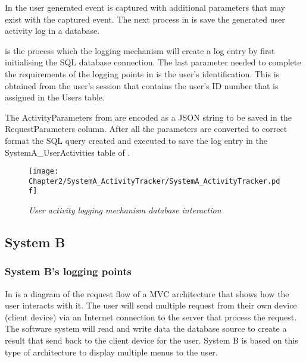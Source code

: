 In  the user generated event is captured with additional parameters that may exist with the captured event. The next process in  is save the generated user activity log in a database.\par {} is the process which the logging mechanism will create a log entry by first initialising the SQL database connection. The last parameter needed to complete the requirements of the logging points in  is the user's identification. This is obtained from the user's session that contains the user's ID number that is assigned in the Users table.\par The ActivityParameters from   are encoded as a JSON string to be saved in the RequestParameters column. After all the parameters are converted to correct format the SQL query created and executed to save the log entry in the SystemA\_UserActivities table of .

\begin{figure}[!htb] %
	\centering %
	\texttt{[image: Chapter2/SystemA\_ActivityTracker/SystemA\_ActivityTracker.pdf]}
	\caption[User activity logging mechanism database interaction]
	{\textit{User activity logging mechanism database interaction}}\label{fig:CH2_SystemA_DB_Interaction_FlowDiagram}
\end{figure}

\clearpage

\subsection{System B}

\subsubsection{System B's logging points}

In  is a diagram of the request flow of a MVC architecture that shows how the user interacts with it. The user will send multiple request from their own device (client device) via an Internet connection to the server that process the request. The software system will read and write data the database source to create a result that send back to the client device for the user. System B is based on this type of architecture to display multiple menus to the user. 

